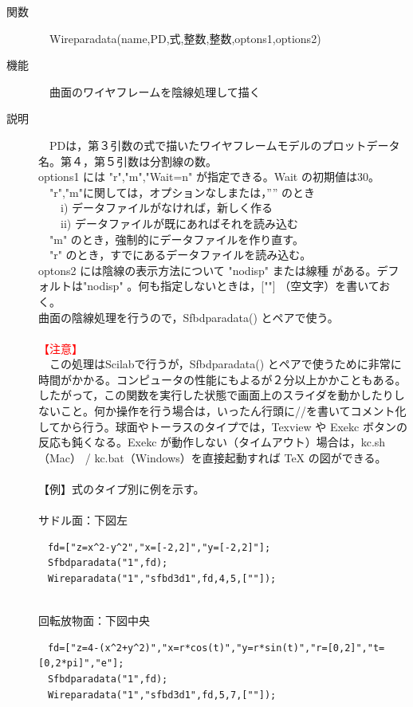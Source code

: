 \documentclass[papersize,a4paper,12pt,uplatex]{jsarticle}
\begin{document}
\begin{description}
\hypertarget{wireparadata}{}
\item[関数]　Wireparadata(name,PD,式,整数,整数,optons1,options2)
\item[機能]　曲面のワイヤフレームを陰線処理して描く
\item[説明]　PDは，第３引数の式で描いたワイヤフレームモデルのプロットデータ名。第４，第５引数は分割線の数。\\
options1 には "r","m","Wait=n" が指定できる。Wait の初期値は30。\\
　"r","m"に関しては，オプションなしまたは，”” のとき\\
　　i) データファイルがなければ，新しく作る\\
　　ii) データファイルが既にあればそれを読み込む\\
　"m"  のとき，強制的にデータファイルを作り直す。\\
　"r" のとき，すでにあるデータファイルを読み込む。\\ 
optons2 には陰線の表示方法について "nodisp" または線種 がある。デフォルトは"nodisp" 。何も指定しないときは，[""] （空文字）を書いておく。\\
曲面の陰線処理を行うので，Sfbdparadata() とペアで使う。\\
　\\
 \textcolor{red}{【注意】} \\
　この処理はScilabで行うが，Sfbdparadata() とペアで使うために非常に時間がかかる。コンピュータの性能にもよるが２分以上かかこともある。したがって，この関数を実行した状態で画面上のスライダを動かしたりしないこと。何か操作を行う場合は，いったん行頭に//を書いてコメント化してから行う。球面やトーラスのタイプでは，Texview や Exekc ボタンの反応も鈍くなる。Exekc が動作しない（タイムアウト）場合は，kc.sh（Mac） / kc.bat（Windows）を直接起動すれば TeX の図ができる。\\
　\\ 
【例】式のタイプ別に例を示す。\\
　\\
サドル面：下図左
\begin{verbatim}
　fd=["z=x^2-y^2","x=[-2,2]","y=[-2,2]"];
　Sfbdparadata("1",fd);
　Wireparadata("1","sfbd3d1",fd,4,5,[""]);
\end{verbatim}
　\\
回転放物面：下図中央
\begin{verbatim}
　fd=["z=4-(x^2+y^2)","x=r*cos(t)","y=r*sin(t)","r=[0,2]","t=[0,2*pi]","e"];
　Sfbdparadata("1",fd);
　Wireparadata("1","sfbd3d1",fd,5,7,[""]);
\end{verbatim}
　\\

\end{description}
\end{document}
